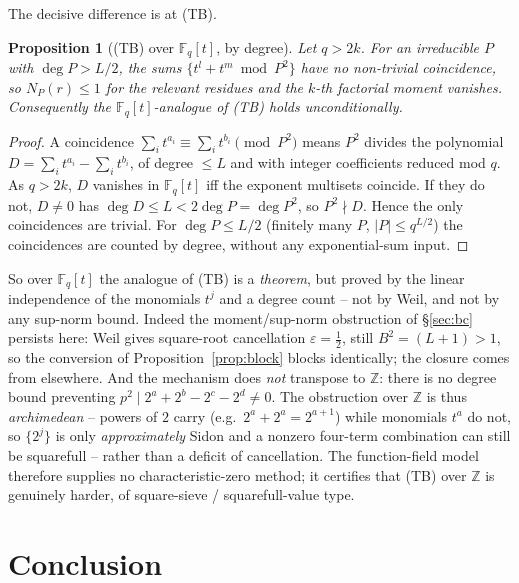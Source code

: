 \documentclass[11pt]{article}
\theoremstyle{plain}
\newtheorem{proposition}[theorem]{Proposition}
\theoremstyle{definition}
\theoremstyle{remark}
\newcommand{\Z}{\mathbb{Z}}
\newcommand{\F}{\mathbb{F}}
\begin{document}
The decisive difference is at (TB).

\begin{proposition}[{(TB) over $\F_q[t]$, by degree}]\label{prop:ff}
Let $q>2k$. For an irreducible $P$ with $\deg P>L/2$, the sums
$\{t^l+t^m\bmod P^2\}$ have no non-trivial coincidence, so $N_P(r)\le1$ for the
relevant residues and the $k$-th factorial moment vanishes. Consequently the
$\F_q[t]$-analogue of (TB) holds unconditionally.
\end{proposition}
\begin{proof}
A coincidence $\sum_it^{a_i}\equiv\sum_it^{b_i}\pmod{P^2}$ means $P^2$ divides the
polynomial $D=\sum_it^{a_i}-\sum_it^{b_i}$, of degree $\le L$ and with integer
coefficients reduced mod $q$. As $q>2k$, $D$ vanishes in $\F_q[t]$ iff the
exponent multisets coincide. If they do not, $D\ne0$ has $\deg D\le L<2\deg P=\deg
P^2$, so $P^2\nmid D$. Hence the only coincidences are trivial. For $\deg P\le
L/2$ (finitely many $P$, $|P|\le q^{L/2}$) the coincidences are counted by degree,
without any exponential-sum input.
\end{proof}

So over $\F_q[t]$ the analogue of (TB) is a \emph{theorem}, but proved by the
linear independence of the monomials $t^j$ and a degree count -- not by Weil, and
not by any sup-norm bound. Indeed the moment/sup-norm obstruction of
\S\ref{sec:bc} persists here: Weil gives square-root cancellation
$\varepsilon=\tfrac12$, still $B^2=(L+1)>1$, so the conversion of
Proposition~\ref{prop:block} blocks identically; the closure comes from
elsewhere. And the mechanism does \emph{not} transpose to $\Z$: there is no
degree bound preventing $p^2\mid2^a+2^b-2^c-2^d\ne0$. The obstruction over $\Z$ is
thus \emph{archimedean} -- powers of $2$ carry (e.g.\ $2^a+2^a=2^{a+1}$) while
monomials $t^a$ do not, so $\{2^j\}$ is only \emph{approximately} Sidon and a
nonzero four-term combination can still be squarefull -- rather than a deficit of
cancellation. The function-field model therefore supplies no characteristic-zero
method; it certifies that (TB) over $\Z$ is genuinely harder, of square-sieve /
squarefull-value type.

\section{Conclusion}
\end{document}
